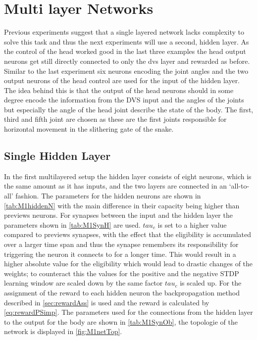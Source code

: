 \section{Multi layer Networks}
Previous experiments suggest that a single layered network lacks complexity to solve this task and thus the next experiments will use a second, hidden layer. As the control of the head worked good in the last three examples the head output neurons get still directly connected to only the dvs layer and rewarded as before. Similar to the last experiment six neurons encoding the joint angles and the two output neurons of the head control are used for the input of the hidden layer. The idea behind this is that the output of the head neurons should in some degree encode the information from the DVS input and the angles of the joints but especially the angle of the head joint describe the state of the body. The first, third and fifth joint are chosen as these are the first joints responsible for horizontal movement in the slithering gate of the snake.

\subsection{Single Hidden Layer}
In the first multilayered setup the hidden layer consists of eight neurons, which is the same amount as it has inputs, and the two layers are connected in an ‘all-to-all’ fashion. The parameters for the hidden neurons are shown in \autoref{tab:M1hiddenN} with the main difference in their capacity being higher than previews neurons. For synapses between the input and the hidden layer the parameters shown in \autoref{tab:M1SynH} are used. $tau_{c}$ is set to a higher value compared to previews synapses, with the effect that the eligibility is accumulated over a larger time span and thus the synapse remembers its responsibility for triggering the neuron it connects to for a longer time. This would result in a higher absolute value for the eligibility which would lead to drastic changes of the weights; to counteract this the values for the positive and the negative STDP learning window are scaled down by the same factor $tau_{c}$ is scaled up. For the assignment of the reward to each hidden neuron the backpropagation method described in \autoref{sec:rewardAss} is used and the reward is calculated by \autoref{eq:rewardPSimp}. The parameters used for the connections from the hidden layer to the output for the body are shown in \autoref{tab:M1SynOb}, the topologie of the network is displayed in \autoref{fig:M1netTop}.

